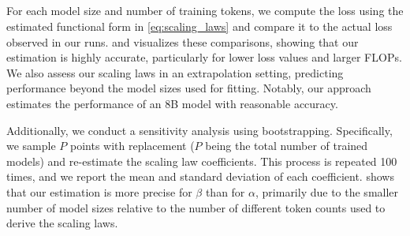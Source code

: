 \begin{figure*}[h!]
\begin{minipage}[t]{0.4\linewidth}
        \begin{minipage}[t]{\linewidth}
            \centering
            \vspace{-2.8cm}
            \setlength{\tabcolsep}{12pt} %
            \renewcommand{\arraystretch}{1} %
            \label{tab:scaling_laws_sensitivity_main}
        \end{minipage}
    \end{minipage}
\end{figure*}


    

\subsection{}
\label{sec:scaling_laws_evaluation}
For each model size and number of training tokens, we compute the loss using the
estimated functional form in \cref{eq:scaling_laws} and compare it to the actual
loss observed in our runs. 
and  visualizes these comparisons, showing
that our estimation is highly accurate, particularly for lower loss values and
larger FLOPs. We also assess our scaling laws in an extrapolation setting,
predicting performance beyond the model sizes used for fitting. Notably, our
approach estimates the performance of an 8B model with reasonable accuracy.  

Additionally, we conduct a sensitivity analysis using bootstrapping.
Specifically, we sample \( P \) points with replacement (\( P \) being the total
number of trained models) and re-estimate the scaling law coefficients. This
process is repeated 100 times, and we report the mean and standard deviation of
each coefficient.  shows that our
estimation is more precise for \(\beta\) than for \(\alpha\), primarily due to
the smaller number of model sizes relative to the number of different token
counts used to derive the scaling laws.






